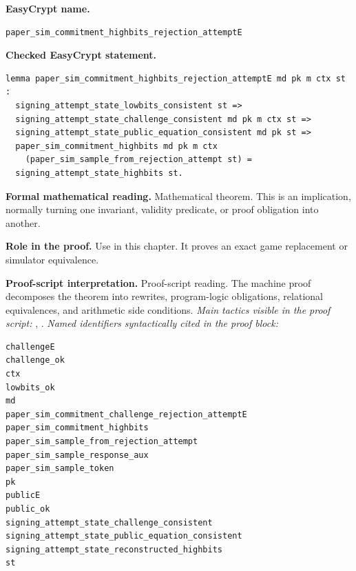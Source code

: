 \begin{formaltheorem}
\noindent\textbf{EasyCrypt name.}
\begin{lstlisting}[language=EasyCrypt,basicstyle=\ttfamily\scriptsize]
paper_sim_commitment_highbits_rejection_attemptE
\end{lstlisting}
\noindent\textbf{Checked EasyCrypt statement.}
\begin{lstlisting}[language=EasyCrypt,basicstyle=\ttfamily\scriptsize]
lemma paper_sim_commitment_highbits_rejection_attemptE md pk m ctx st :
  signing_attempt_state_lowbits_consistent st =>
  signing_attempt_state_challenge_consistent md pk m ctx st =>
  signing_attempt_state_public_equation_consistent md pk st =>
  paper_sim_commitment_highbits md pk m ctx
    (paper_sim_sample_from_rejection_attempt st) =
  signing_attempt_state_highbits st.
\end{lstlisting}
\noindent\textbf{Formal mathematical reading.}
Mathematical theorem. This is an implication, normally turning one invariant, validity predicate, or proof obligation into another.

\noindent\textbf{Role in the proof.}
Use in this chapter. It proves an exact game replacement or simulator equivalence.

\noindent\textbf{Proof-script interpretation.}
Proof-script reading. The machine proof decomposes the theorem into rewrites, program-logic obligations, relational equivalences, and arithmetic side conditions.
\emph{Main tactics visible in the proof script:} , .
\emph{Named identifiers syntactically cited in the proof block:}
\begin{lstlisting}[language=EasyCrypt,basicstyle=\ttfamily\scriptsize]
challengeE
challenge_ok
ctx
lowbits_ok
md
paper_sim_commitment_challenge_rejection_attemptE
paper_sim_commitment_highbits
paper_sim_sample_from_rejection_attempt
paper_sim_sample_response_aux
paper_sim_sample_token
pk
publicE
public_ok
signing_attempt_state_challenge_consistent
signing_attempt_state_public_equation_consistent
signing_attempt_state_reconstructed_highbits
st
\end{lstlisting}

\end{formaltheorem}


